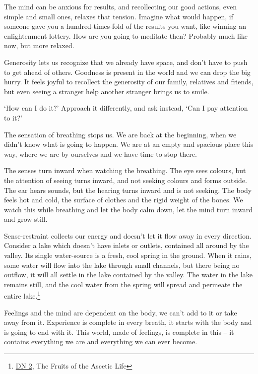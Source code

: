 The mind can be anxious for results, and recollecting our good actions,
even simple and small ones, relaxes that tension. Imagine what would
happen, if someone gave you a hundred-times-fold of the results you
want, like winning an enlightenment lottery. How are you going to
meditate then? Probably much like now, but more relaxed.

Generosity lets us recognize that we already have space, and don't have
to push to get ahead of others. Goodness is present in the world and we
can drop the big hurry. It feels joyful to recollect the generosity of
our family, relatives and friends, but even seeing a stranger help
another stranger brings us to smile.


`How can I do it?' Approach it differently, and ask instead, `Can I pay
attention to it?'

The sensation of breathing stops us. We are back at the beginning, when
we didn't know what is going to happen. We are at an empty and spacious
place this way, where we are by ourselves and we have time to stop
there.

The senses turn inward when watching the breathing. The eye sees
colours, but the attention of seeing turns inward, and not seeking
colours and forms outside. The ear hears sounds, but the hearing turns
inward and is not seeking. The body feels hot and cold, the surface of
clothes and the rigid weight of the bones. We watch this while breathing
and let the body calm down, let the mind turn inward and grow still.


\enlargethispage*{3\baselineskip}

Sense-restraint collects our energy and doesn't let it flow away in
every direction. Consider a lake which doesn't have inlets or outlets,
contained all around by the valley. Its single water-source is a fresh,
cool spring in the ground. When it rains, some water will flow into the
lake through small channels, but there being no outflow, it will all
settle in the lake contained by the valley. The water in the lake
remains still, and the cool water from the spring will spread and
permeate the entire lake.\footnote{\href{https://suttacentral.net/dn2}{DN
  2}, The Fruits of the Ascetic Life}

Feelings and the mind are dependent on the body, we can't add to it or
take away from it. Experience is complete in every breath, it starts
with the body and is going to end with it. This world, made of feelings,
is complete in this -- it contains everything we are and everything we
can ever become.

